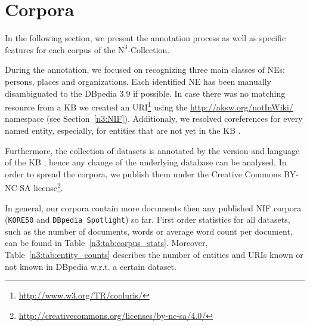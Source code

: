 \section{Corpora}
\label{n3:sec:Features}




In the following section, we present the annotation process as well as specific features for each corpus of the $\mbox{N}^3$-Collection.

During the annotation, we focused on recognizing three main classes of NEs: persons, places and organizations. 
Each identified NE has been manually disambiguated to the DBpedia 3.9  if possible.
In case there was no matching resource from a \ac{KB}  we created an URI\footnote{\url{http://www.w3.org/TR/cooluris/}} using the \url{http://aksw.org/notInWiki/} namespace (see Section~\ref{n3:NIF}).
Additionaly, we resolved coreferences for every named entity, especially, for entities that are not yet in the \ac{KB} . %

Furthermore, the collection of datasets is annotated by the version and language of the \ac{KB} , hence any change of the underlying database can be analysed.
In order to spread the corpora, we publish them under the Creative Commons BY-NC-SA license\footnote{\url{http://creativecommons.org/licenses/by-nc-sa/4.0/}}.

In general, our corpora contain more documents then any published NIF corpora (\texttt{KORE50} and \texttt{DBpedia Spotlight}) so far.
First order statistics for all datasets, such as the number of documents, words or average word count per document, can be found in Table~\ref{n3:tab:corpus_stats}.
Moreover, Table~\ref{n3:tab:entity_counts} describes the number of entities and URIs known or not known in DBpedia w.r.t. a certain dataset.


\begin{table}[htb!]
	\centering
	\caption{Features of the corpora and their documents.}
	\label{n3:tab:corpus_stats}
\end{table}

